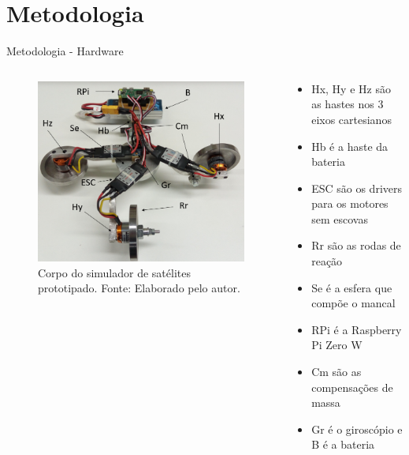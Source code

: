 \documentclass{beamer}
\begin{document}
\section{Metodologia}
\begin{frame}{Metodologia - Hardware}

\begin{columns}
    \begin{column}{0.50\textwidth}
    \begin{figure}[HT]
		\begin{center}
		\captionsetup{justification=centering}
        \includegraphics[scale=.3]{../metodologia/img/corpo_real}
        \caption{Corpo do simulador de satélites prototipado. \newline
        		 Fonte: Elaborado pelo autor.}
		\label{FIG_ADAPTATIVO}
        \end{center}
	\end{figure}
    \end{column}
    \begin{column}{0.5\textwidth}

	\begin{itemize}
    	\justifying
    	\item Hx, Hy e Hz são as hastes nos 3 eixos cartesianos
    	\item Hb é a haste da bateria
    	\item ESC são os drivers para os motores sem escovas
    	\item Rr são as rodas de reação
    	\item Se é a esfera que compõe o mancal
    	\item RPi é a Raspberry Pi Zero W
    	\item Cm são as compensações de massa
    	\item Gr é o giroscópio e B é a bateria
    \end{itemize}
    \end{column}
\end{columns}
\end{frame}
\end{document}
